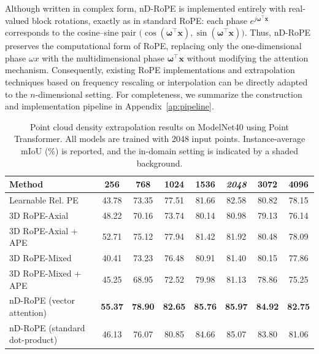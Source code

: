 \documentclass{article}
\theoremstyle{plain}
\theoremstyle{definition}
\theoremstyle{remark}
\begin{document}
Although written in complex form, nD-RoPE is implemented entirely with real-valued block rotations, exactly as in standard RoPE: each phase $e^{j\boldsymbol{\omega}^\top \mathbf{x}}$ corresponds to the cosine--sine pair $\bigl(\cos(\boldsymbol{\omega}^\top \mathbf{x}), \sin(\boldsymbol{\omega}^\top \mathbf{x})\bigr)$. 
Thus, nD-RoPE preserves the computational form of RoPE, replacing only the one-dimensional phase $\omega x$ with the multidimensional phase $\boldsymbol{\omega}^\top\mathbf{x}$ without modifying the attention mechanism. 
Consequently, existing RoPE implementations and extrapolation techniques based on frequency rescaling or interpolation can be directly adapted to the $n$-dimensional setting. 
For completeness, we summarize the construction and implementation pipeline in Appendix~\ref{ap:pipeline}.

\begin{table}[t]
\centering
\small
\caption{Point cloud density extrapolation results on ModelNet40 using Point Transformer. All models are trained with 2048 input points. Instance-average mIoU (\%) is reported, and the in-domain setting is indicated by a shaded background.}
\label{tab:modelnet40_extrapolation}
\begin{tabular}{l@{\quad}ccccccc}
\toprule
Method 
& 256
& 768 
& 1024 
& 1536 
& \cellcolor{gray!15}\textit{2048} 
& 3072 
& 4096 \\
\midrule
Learnable Rel. PE
& 43.78
& 73.35
& 77.51
& 81.66
& \cellcolor{gray!15}82.58
& 80.82
& 78.15 \\

3D RoPE-Axial
& 48.22
& 70.16
& 73.74
& 80.14
& \cellcolor{gray!15}80.98
& 79.13
& 76.14 \\

3D RoPE-Axial + APE
& 52.71
& 75.12
& 77.94
& 81.42
& \cellcolor{gray!15}81.92
& 80.48
& 78.09 \\

3D RoPE-Mixed
& 40.41
& 73.23
& 76.48
& 80.91
& \cellcolor{gray!15}81.40
& 80.15
& 77.86 \\

3D RoPE-Mixed + APE
& 45.25
& 68.95
& 72.52
& 79.98
& \cellcolor{gray!15}81.13
& 78.86
& 75.25 \\

\midrule
nD-RoPE (vector attention)
& \textbf{55.37}
& \textbf{78.90}
& \textbf{82.65}
& \textbf{85.76}
& \cellcolor{gray!15}\textbf{85.97}
& \textbf{84.92}
& \textbf{82.75} \\

nD-RoPE (standard dot-product)
& 46.13
& 76.07
& 80.85
& 84.66
& \cellcolor{gray!15}85.07
& 83.80
& 81.06 \\

\bottomrule
\end{tabular}
\end{table}
\end{document}
